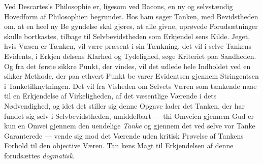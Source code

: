 \documentclass[12pt,a4paper]{book}
\begin{document}
Ved Descartes's Philosophie er, ligesom ved Bacons, en
ny og selvstændig Hovedform af Philosophien begrundet. Hos
ham søger Tanken, med Bevidstheden om, at en heel ny Be\-%
gyndelse skal gjøres, at alle givne, uprøvede Forudsætninger
skulle bortkastes, tilbage til Selvbevidstheden som Erkjendel\-%
sens Kilde. Jeget, hvis Væsen er Tænken, vil være præsent
i sin Tænkning, det vil i selve Tankens Evidents, i Erkjen\-%
delsens Klarhed og Tydelighed, søge Kriteriet paa Sandheden.
Og fra det første sikkre Punkt, der vindes, vil det udlede hele
Indholdet ved en sikker Methode, der paa ethvert Punkt be\-%
varer Evidentsen gjennem Stringentsen i Tanketilknytningen.
Det vil fra Visheden om Selvets Væren som tænkende naae
til en Erkjendelse af Virkeligheden, af det væsentlige Værende
i dets Nødvendighed, og idet det stiller sig denne Opgave
lader det Tanken, der har fundet sig selv i Selvbevidstheden,
umiddelbart --- thi Omveien gjennem Gud er kun en Omvei
gjennem den uendelige \emph{Tanke} og gjennem det ved selve vor
Tanke Garanterede --- vende sig mod det Værende uden kritisk
Prøvelse af Tankens Forhold til den objective Væren. Tan\-%
kens Magt til Erkjendelsen af denne forudsættes \emph{dogmatisk}.
\end{document}

